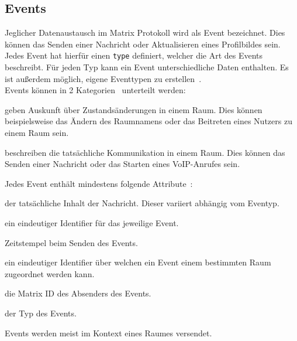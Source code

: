     \subsection{Events}\label{sec:events}
    Jeglicher Datenaustausch im Matrix Protokoll wird als Event bezeichnet.
    Dies können das Senden einer Nachricht oder Aktualisieren eines Profilbildes sein.
    Jedes Event hat hierfür einen \texttt{type} definiert, welcher die Art des Events beschreibt.
    Für jeden Typ kann ein Event unterschiedliche Daten enthalten.
    Es ist außerdem möglich, eigene Eventtypen zu erstellen~\cite{events}.\\
    Events können in 2 Kategorien~\cite{roomevents} unterteilt werden:
    \begin{description}[leftmargin=!,labelwidth=3.5cm]
        \item [State events] geben Auskunft über Zustandsänderungen in einem Raum. Dies können beispielsweise das Ändern des Raumnamens oder das Beitreten eines Nutzers zu einem Raum sein.
        \item [Message events] beschreiben die tatsächliche Kommunikation in einem Raum. Dies können das Senden einer Nachricht oder das Starten eines VoIP-Anrufes sein.
    \end{description}

    Jedes Event enthält mindestens folgende Attribute~\cite{eventformat}:
    \begin{description}[leftmargin=!,labelwidth=3.5cm]
        \item [content] der tatsächliche Inhalt der Nachricht. Dieser variiert abhängig vom Eventyp.
        \item [event\_id] ein eindeutiger Identifier für das jeweilige Event.
        \item [origin\_server\_ts] Zeitstempel beim Senden des Events.
        \item [room\_id] ein eindeutiger Identifier über welchen ein Event einem bestimmten Raum zugeordnet werden kann.
        \item [sender] die Matrix ID des Absenders des Events.
        \item [type] der Typ des Events.
    \end{description}

    Events werden meist im Kontext eines Raumes versendet.

    \newpage
